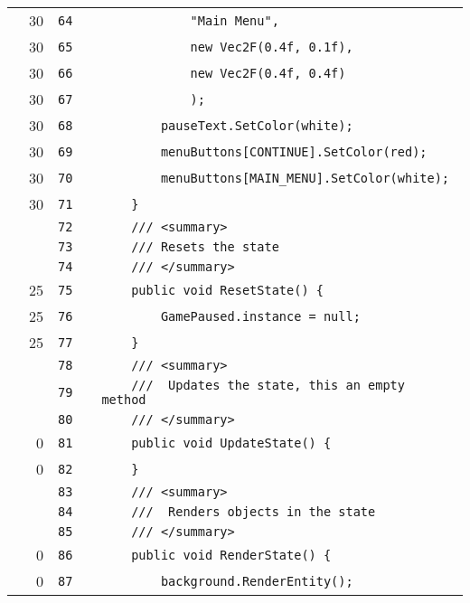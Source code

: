 \documentclass[a4paper,landscape,10pt]{article}
\begin{document}
\begin{longtable}[l]{lrrll}
\cellcolor{green} & 30 & \verb~64~ & & \verb~            "Main Menu",~\\
\cellcolor{green} & 30 & \verb~65~ & & \verb~            new Vec2F(0.4f, 0.1f),~\\
\cellcolor{green} & 30 & \verb~66~ & & \verb~            new Vec2F(0.4f, 0.4f)~\\
\cellcolor{green} & 30 & \verb~67~ & & \verb~            );~\\
\cellcolor{green} & 30 & \verb~68~ & & \verb~        pauseText.SetColor(white);~\\
\cellcolor{green} & 30 & \verb~69~ & & \verb~        menuButtons[CONTINUE].SetColor(red);~\\
\cellcolor{green} & 30 & \verb~70~ & & \verb~        menuButtons[MAIN_MENU].SetColor(white);~\\
\cellcolor{green} & 30 & \verb~71~ & & \verb~    }~\\
\cellcolor{gray} &  & \verb~72~ & & \verb~    /// <summary>~\\
\cellcolor{gray} &  & \verb~73~ & & \verb~    /// Resets the state~\\
\cellcolor{gray} &  & \verb~74~ & & \verb~    /// </summary>~\\
\cellcolor{green} & 25 & \verb~75~ & & \verb~    public void ResetState() {~\\
\cellcolor{green} & 25 & \verb~76~ & & \verb~        GamePaused.instance = null;~\\
\cellcolor{green} & 25 & \verb~77~ & & \verb~    }~\\
\cellcolor{gray} &  & \verb~78~ & & \verb~    /// <summary>~\\
\cellcolor{gray} &  & \verb~79~ & & \verb~    ///  Updates the state, this an empty method~\\
\cellcolor{gray} &  & \verb~80~ & & \verb~    /// </summary>~\\
\cellcolor{red} & 0 & \verb~81~ & & \verb~    public void UpdateState() {~\\
\cellcolor{red} & 0 & \verb~82~ & & \verb~    }~\\
\cellcolor{gray} &  & \verb~83~ & & \verb~    /// <summary>~\\
\cellcolor{gray} &  & \verb~84~ & & \verb~    ///  Renders objects in the state~\\
\cellcolor{gray} &  & \verb~85~ & & \verb~    /// </summary>~\\
\cellcolor{red} & 0 & \verb~86~ & & \verb~    public void RenderState() {~\\
\cellcolor{red} & 0 & \verb~87~ & & \verb~        background.RenderEntity();~\\

\end{longtable}
\end{document}
